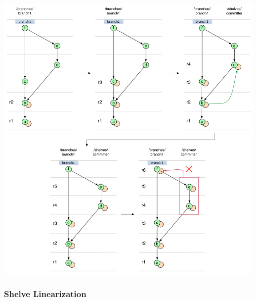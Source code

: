 \begin{center}
\includegraphics[width=\textwidth]{img/diagrams/ml_boat_merge_git_to_svn.pdf}%
\label{boat_merge_git_to_svn}%
\end{center}

\subsubsection{Shelve Linearization}

